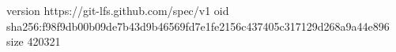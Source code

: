 version https://git-lfs.github.com/spec/v1
oid sha256:f98f9db00b09de7b43d9b46569fd7e1fe2156c437405c317129d268a9a44e896
size 420321
